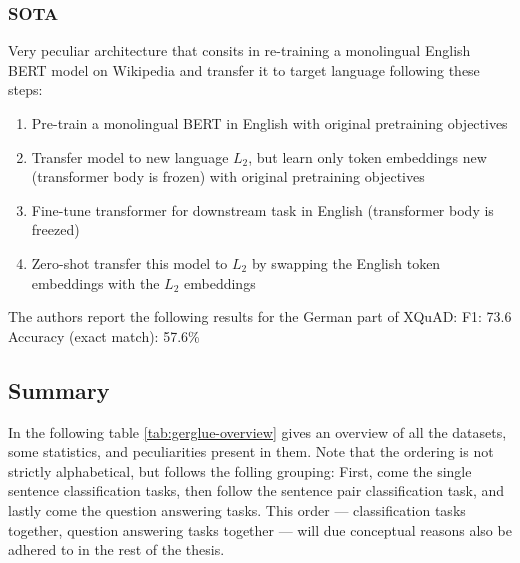 


\subsubsection{SOTA}

Very peculiar architecture that consits in re-training a monolingual English BERT model on
Wikipedia and transfer it to target language following these steps:

\begin{enumerate}
    \item Pre-train a monolingual BERT in English with original pretraining objectives
    \item Transfer model to new language $L_2$, but learn only token embeddings new (transformer body is frozen) with original pretraining objectives
    \item Fine-tune transformer for downstream task in English (transformer body is freezed)
    \item Zero-shot transfer this model to $L_2$ by swapping the English token embeddings with the $L_2$ embeddings
\end{enumerate}

The authors report the following results for the German part of XQuAD:
F1: 73.6
Accuracy (exact match): 57.6\%

\subsection{Summary}

In the following table \ref{tab:gerglue-overview} gives an overview of all the datasets, some statistics, and
peculiarities present in them. Note that the ordering is not strictly alphabetical, but follows the folling grouping:
First, come the single sentence classification tasks, then follow the sentence pair classification task, and lastly
come the question answering tasks. This order --- classification tasks together, question answering tasks together ---
will due conceptual reasons also be adhered to in the rest of the thesis.

